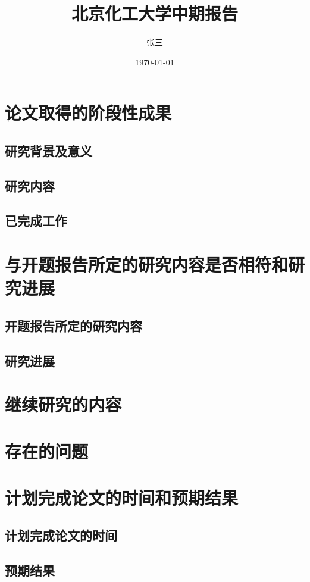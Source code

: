 \documentclass[UTF8]{ctexart}
\title{北京化工大学中期报告}
\author{张三}
\date{\today}
\begin{document}
\songti{}        %
\setlength{\baselineskip}{18pt}         %
\maketitle\thispagestyle{empty}         %
\newpage
{}
\setcounter{page}{1}
\tableofcontents
\newpage
\setcounter{page}{1}
\pagestyle{plain}

\section{论文取得的阶段性成果}
\subsection{研究背景及意义}
\subsection{研究内容}
\subsection{已完成工作}

\section{与开题报告所定的研究内容是否相符和研究进展}
\subsection{开题报告所定的研究内容}
\subsection{研究进展}

\section{继续研究的内容}

\section{存在的问题}

\section{计划完成论文的时间和预期结果}
\subsection{计划完成论文的时间}
\subsection{预期结果}

% 
\end{document}
